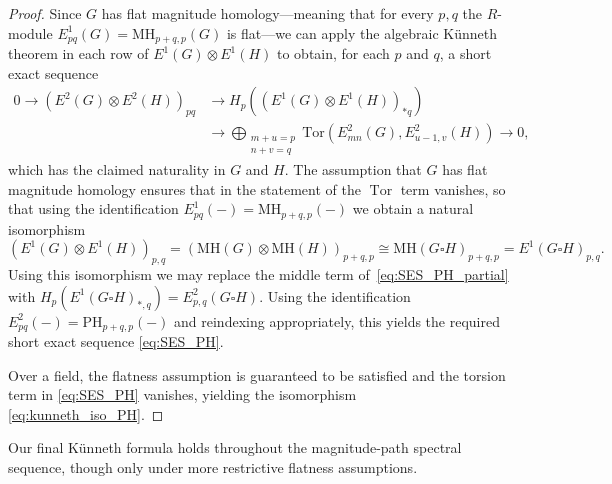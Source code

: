 \documentclass[a4paper, 11 pt, oneside, reqno]{amsart}
\numberwithin{lemma}{section}
\theoremstyle{definition}
\newcommand{\xto}{\xrightarrow}
\DeclareMathOperator{\tor}{Tor}
\newcommand{\MH}{\mathrm{MH}}
\newcommand{\PH}{\mathrm{PH}}
\newcommand{\MPSS}{E}
\begin{document}
\begin{proof}
    Since \(G\) has flat magnitude homology---meaning that for every \(p,q\) the \(R\)-module \(\MPSS_{pq}^1(G)=\MH_{p+q,p}(G)\) is flat---we can apply the algebraic K\"unneth theorem in each row of \(\MPSS^{1}(G) \otimes \MPSS^{1}(H)\) to obtain, for each \(p\) and \(q\), a short exact sequence
    \begin{equation}
    \label{eq:SES_PH_partial}
    \begin{split}
    0 \to \left(\MPSS^{2}(G) \otimes \MPSS^{2}(H)\right)_{pq} & \xto{} H_p \left( (\MPSS^{1}(G) \otimes \MPSS^{1}(H) )_{\ast q} \right) \\
    &\to \bigoplus_{\substack{m+u=p \\ n+v = q}} \mathrm{Tor}(\MPSS^{2}_{mn}(G),\MPSS^{2}_{u-1,v}(H)) \to 0,
    \end{split}
    \end{equation}
    which has the claimed naturality in \(G\) and \(H\). 
    The assumption that \(G\) has flat magnitude homology ensures that in the statement of  the \(\tor\) term vanishes, 
    so that using the identification  \(\MPSS_{pq}^1(-) = \MH_{p+q,p}(-)\)
    we obtain a natural isomorphism
    \[
    (\MPSS^{1}(G) \otimes \MPSS^{1}(H) )_{p,q}
    =
    (\MH(G) \otimes \MH(H))_{p+q,p} \cong \MH(G \square H)_{p+q,p}
    =\MPSS^1(G\square H)_{p,q}.
    \]
    Using this isomorphism we may replace the middle term of~\eqref{eq:SES_PH_partial} with $H_p(\MPSS^1(G\square H)_{\ast,q})
    =\MPSS^2_{p,q}(G\square H)$.
    Using the identification \(\MPSS_{pq}^2(-) = \PH_{p+q,p}(-)\) and reindexing appropriately, this yields the required short exact sequence \eqref{eq:SES_PH}.

    Over a field, the flatness assumption is guaranteed to be satisfied and the torsion term in \eqref{eq:SES_PH} vanishes, yielding the isomorphism \eqref{eq:kunneth_iso_PH}.
\end{proof}

Our final K\"unneth formula holds throughout the magnitude-path spectral sequence, though only under more restrictive flatness assumptions.
\end{document}
